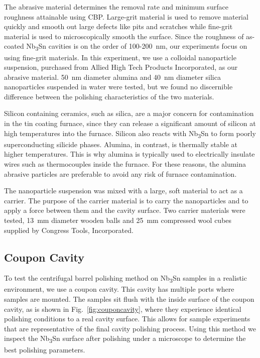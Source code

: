 The abrasive material determines the removal rate and minimum surface roughness attainable using CBP. Large-grit material is used to remove material quickly and smooth out large defects like pits and scratches while fine-grit material is used to microscopically smooth the surface. Since the roughness of as-coated Nb\textsubscript{3}Sn cavities is on the order of 100-200~nm, our experiments focus on using fine-grit materials. In this experiment, we use a colloidal nanoparticle suspension, purchased from Allied High Tech Products Incorporated, as our abrasive material. 50~nm diameter alumina and 40~nm diameter silica nanoparticles suspended in water were tested, but we found no discernible difference between the polishing characteristics of the two materials.

Silicon containing ceramics, such as silica, are a major concern for contamination in the tin coating furnace, since they can release a significant amount of silicon at high temperatures into the furnace. Silicon also reacts with Nb\textsubscript{3}Sn to form poorly superconducting silicide phases. Alumina, in contrast, is thermally stable at higher temperatures. This is why alumina is typically used to electrically insulate wires such as thermocouples inside the furnace. For these reasons, the alumina abrasive particles are preferable to avoid any risk of furnace contamination.

The nanoparticle suspension was mixed with a large, soft material to act as a carrier. The purpose of the carrier material is to carry the nanoparticles and to apply a force between them and the cavity surface. Two carrier materials were tested, 13~mm diameter wooden balls and 25~mm compressed wool cubes supplied by Congress Tools, Incorporated.

%
\subsection{Coupon Cavity}%
\label{subsec:couponcavity}%
To test the centrifugal barrel polishing method on Nb\textsubscript{3}Sn samples in a realistic environment, we use a coupon cavity\cite{higuchi1996investigation}. This cavity has multiple ports where samples are mounted. The samples sit flush with the inside surface of the coupon cavity, as is shown in Fig.~\ref{fig:couponcavity}, where they experience identical polishing conditions to a real cavity surface. This allows for sample experiments that are representative of the final cavity polishing process. Using this method we inspect the Nb\textsubscript{3}Sn surface after polishing under a microscope to determine the best polishing parameters.

